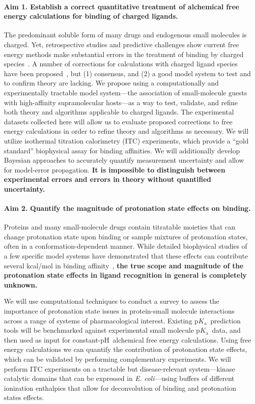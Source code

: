 \documentclass[10pt,final]{article}
\newcommand{\pKa}{p$K_\mathrm{a}$\ }
\newcommand{\pH}{p$\mathrm{H}$\ }
\begin{document}
\paragraph*{Aim 1. Establish a correct quantitative treatment of alchemical free energy calculations for binding of charged ligands.}
The predominant soluble form of many drugs and endogenous small molecules is charged.
Yet, retrospective studies and predictive challenges show current free energy methods make substantial errors in the treatment of binding by charged species~\cite{Rocklin2013b,Muddana2014a}.
A number of corrections for calculations with charged ligand species have been proposed~\cite{Reif2013a,Rocklin2013a, Lin2014a}, but (1) consensus, and (2) a good model system to test and to confirm theory are lacking.
We propose using a computationally and experimentally tractable model system---the association of small-molecule guests with high-affinity supramolecular hosts---as a way to test, validate, and refine both theory and algorithms applicable to charged ligands.
The experimental datasets collected here will allow us to evaluate proposed corrections to free energy calculations in order to refine theory and algorithms as necessary.
We will utilize isothermal titration calorimetry (ITC) experiments, which provide a “gold standard” biophysical assay for binding affinities.
We will additionally develop Bayesian approaches to accurately quantify measurement uncertainty and allow for model-error propagation.
\textbf{It is impossible to distinguish between experimental errors and errors in theory without quantified uncertainty.
}

\paragraph*{Aim 2. Quantify the magnitude of protonation state effects on binding.}
Proteins and many small-molecule drugs contain titratable moieties that can change protonation state upon binding or sample mixtures of protonation states, often in a conformation-dependent manner.
While detailed biophysical studies of a few specific model systems have demonstrated that these effects can contribute several kcal/mol in binding affinity~\cite{Aleksandrov2007a,Czodrowski2007a,Steuber2007a,Czodrowski2007b}, \textbf{the true scope and magnitude of the protonation state effects in ligand recognition in general is completely unknown.}

We will use computational techniques to conduct a survey to assess the importance of protonation state issues in protein-small molecule interactions across a range of systems of pharmacological interest.
Existing \pKa prediction tools will be benchmarked against experimental small molecule \pKa data, and then used as input for constant-\pH alchemical free energy calculations. Using free energy calculations we can quantify the contribution of protonation state effects, which can be validated by performing complementary experiments. We will perform ITC experiments on a tractable but disease-relevant system---kinase catalytic domains that can be expressed in \textit{E. coli}---using buffers of different ionization enthalpies that allow for deconvolution of binding and protonation states effects.
\end{document}
